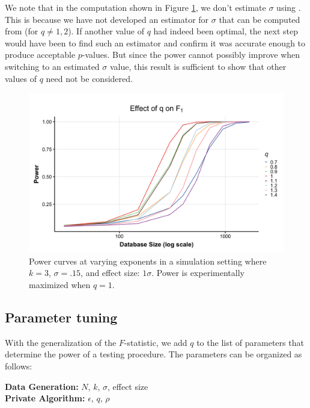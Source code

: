 We note that in the computation shown in Figure \ref{fig:fqpower}, we don't estimate $\sigma$ using \sqe.  This is because we have not developed an estimator for $\sigma$ that can be computed from \sqe (for $q \ne 1, 2$).  If another value of $q$ had indeed been optimal, the next step would have been to find such an estimator and confirm it was accurate enough to produce acceptable $p$-values.  But since the power cannot possibly improve when switching to an estimated $\sigma$ value, this result is sufficient to show that other values of $q$ need not be considered.


\begin{figure}
\centering
\includegraphics[width=\linewidth]{fq-power.png}
\caption{Power curves at varying exponents in a simulation setting where $k = 3$, $\sigma = .15$, and effect size: $1\sigma$. Power is experimentally maximized when $q = 1$.}\label{fig:fqpower}
\end{figure}



\subsection{Parameter tuning}\label{subsec:params}

With the generalization of the $F$-statistic, we add $q$ to the list of parameters that determine the power of a testing procedure. The parameters can be organized as follows:

\vspace{3mm}
\textbf{Data Generation:} $N$, $k$, $\sigma$, effect size \\
\indent\textbf{Private Algorithm:} $\epsilon$, $q$, $\rho$
\vspace{3mm}

